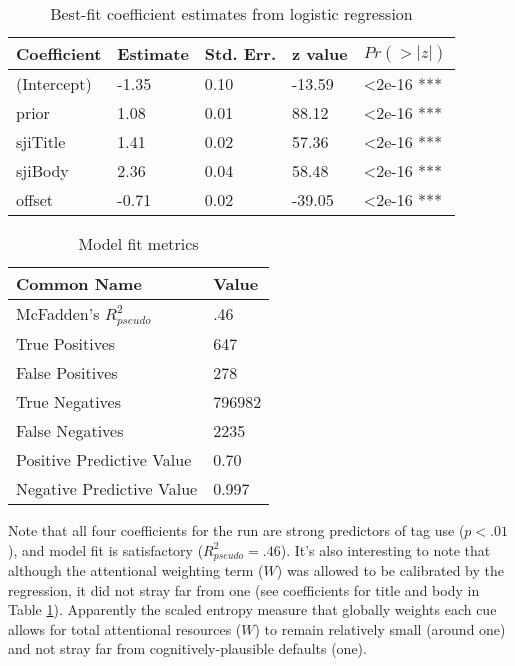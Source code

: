 \documentclass[10pt,letterpaper]{article}
\begin{document}
\renewcommand{\arraystretch}{1}%
\renewcommand{\tabcolsep}{1mm}
\begin{table}[!ht]
  \begin{center} 
    \caption{Best-fit coefficient estimates from logistic regression} 
    \label{tab:coeffs} 
    \vskip 0.12in
    \begin{tabular}{lllll} 
      \hline
      Coefficient & 	Estimate &	Std. Err. &	z value &	$Pr(>|z|)$  \\
      \hline
      (Intercept) &	-1.35 &		0.10 &		-13.59 &	\textless2e-16 *** \\
      prior &		1.08 & 		0.01 &		88.12 & 	\textless2e-16 *** \\
      sjiTitle &	1.41 &		0.02 &		57.36 &		\textless2e-16 *** \\
      sjiBody &		2.36 &		0.04 &		58.48 &		\textless2e-16 *** \\
      offset &		-0.71 &		0.02 &		-39.05 &	\textless2e-16 *** \\
      \hline
    \end{tabular} 
  \end{center} 
\end{table}

\renewcommand{\arraystretch}{1}%
\renewcommand{\tabcolsep}{3mm}
\begin{table}[!ht]
  \begin{center} 
    \caption{Model fit metrics} 
    \label{tab:fits} 
    \vskip 0.12in
    \begin{tabular}{ll} 
      \hline
      Common Name &  Value	\\
      \hline
      McFadden's $R_{pseudo}^{2}$ &	.46 \\
      True Positives &			647 \\
      False Positives &			278 \\
      True Negatives &			\num{796982} \\
      False Negatives &			\num{2235} \\
      Positive Predictive Value &	0.70 \\
      Negative Predictive Value &	0.997 \\
      \hline
    \end{tabular} 
  \end{center} 
\end{table}

Note that all four coefficients for the run are strong predictors of tag use ($p<.01$), and model fit is satisfactory ($R_{pseudo}^{2}=.46$).
It's also interesting to note that although the attentional weighting term ($W$) was allowed to be calibrated by the regression, it did not stray far from one
(see coefficients for title and body in Table \ref{tab:coeffs}).
Apparently the scaled entropy measure that globally weights each cue allows for total attentional resources ($W$) to remain relatively small (around one) and not stray far from cognitively-plausible defaults (one).
\end{document}
